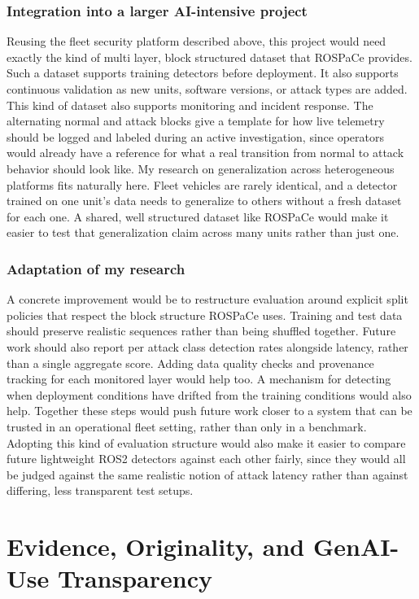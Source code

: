 \documentclass[11pt,a4paper]{article}
\begin{document}
\subsubsection{Integration into a larger AI-intensive project}
Reusing the fleet security platform described above, this project would need exactly the kind of multi layer, block structured dataset that ROSPaCe provides. Such a dataset supports training detectors before deployment. It also supports continuous validation as new units, software versions, or attack types are added. This kind of dataset also supports monitoring and incident response. The alternating normal and attack blocks give a template for how live telemetry should be logged and labeled during an active investigation, since operators would already have a reference for what a real transition from normal to attack behavior should look like. My research on generalization across heterogeneous platforms fits naturally here. Fleet vehicles are rarely identical, and a detector trained on one unit's data needs to generalize to others without a fresh dataset for each one. A shared, well structured dataset like ROSPaCe would make it easier to test that generalization claim across many units rather than just one.

\subsubsection{Adaptation of my research}
A concrete improvement would be to restructure evaluation around explicit split policies that respect the block structure ROSPaCe uses. Training and test data should preserve realistic sequences rather than being shuffled together. Future work should also report per attack class detection rates alongside latency, rather than a single aggregate score. Adding data quality checks and provenance tracking for each monitored layer would help too. A mechanism for detecting when deployment conditions have drifted from the training conditions would also help. Together these steps would push future work closer to a system that can be trusted in an operational fleet setting, rather than only in a benchmark. Adopting this kind of evaluation structure would also make it easier to compare future lightweight ROS2 detectors against each other fairly, since they would all be judged against the same realistic notion of attack latency rather than against differing, less transparent test setups.

\section{Evidence, Originality, and GenAI-Use Transparency}
\end{document}

